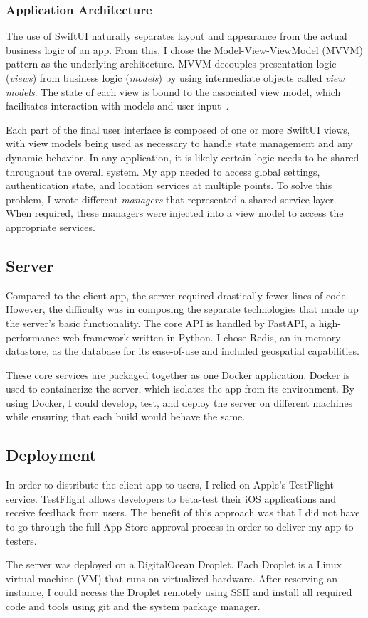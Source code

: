 \subsubsection{Application Architecture}

The use of \textsf{SwiftUI} naturally separates layout and appearance from the actual business logic of an app. From this, I chose the Model-View-ViewModel (\textsc{MVVM}) pattern as the underlying architecture. \textsc{MVVM} decouples presentation logic (\emph{views}) from business logic (\emph{models}) by using intermediate objects called \emph{view models}. The state of each view is bound to the associated view model, which facilitates interaction with models and user input~\cite{britch_2021,hudson_2019}.

Each part of the final user interface is composed of one or more \textsf{SwiftUI} views, with view models being used as necessary to handle state management and any dynamic behavior. In any application, it is likely certain logic needs to be shared throughout the overall system. My app needed to access global settings, authentication state, and location services at multiple points. To solve this problem, I wrote different \emph{managers} that represented a shared service layer. When required, these managers were injected into a view model to access the appropriate services.

\subsection{Server}

Compared to the client app, the server required drastically fewer lines of code. However, the difficulty was in composing the separate technologies that made up the server's basic functionality. The core \textsc{API} is handled by \textsf{FastAPI}, a high-performance web framework written in Python. I chose Redis, an in-memory datastore, as the database for its ease-of-use and included geospatial capabilities.

These core services are packaged together as one Docker application. Docker is used to containerize the server, which isolates the app from its environment. By using Docker, I could develop, test, and deploy the server on different machines while ensuring that each build would behave the same.

\subsection{Deployment}

In order to distribute the client app to users, I relied on Apple's TestFlight service. TestFlight allows developers to beta-test their iOS applications and receive feedback from users. The benefit of this approach was that I did not have to go through the full App Store approval process in order to deliver my app to testers.

The server was deployed on a DigitalOcean Droplet. Each Droplet is a Linux virtual machine (\textsc{VM}) that runs on virtualized hardware. After reserving an instance, I could access the Droplet remotely using \textsc{SSH} and install all required code and tools using \textsf{git} and the system package manager.
